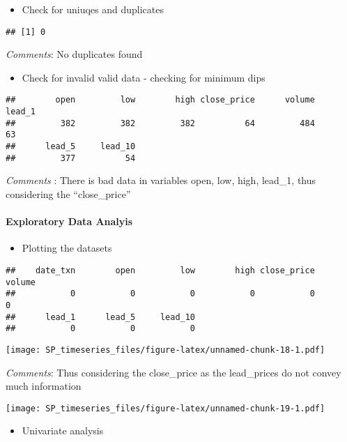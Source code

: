 \documentclass[]{article}
\providecommand{\tightlist}{%
  \setlength{\itemsep}{0pt}\setlength{\parskip}{0pt}}
\let\oldparagraph\paragraph
\renewcommand{\paragraph}[1]{\oldparagraph{#1}\mbox{}}
\begin{document}
\begin{itemize}
\tightlist
\item
  Check for uniuqes and duplicates
\end{itemize}

\begin{verbatim}
## [1] 0
\end{verbatim}

\emph{Comments}: No duplicates found

\begin{itemize}
\tightlist
\item
  Check for invalid valid data - checking for minimum dips
\end{itemize}

\begin{verbatim}
##        open         low        high close_price      volume      lead_1 
##         382         382         382          64         484          63 
##      lead_5     lead_10 
##         377          54
\end{verbatim}

\emph{Comments} : There is bad data in variables open, low, high,
lead\_1, thus considering the ``close\_price''

\paragraph{Exploratory Data Analyis}\label{exploratory-data-analyis}

\begin{itemize}
\tightlist
\item
  Plotting the datasets
\end{itemize}

\begin{verbatim}
##    date_txn        open         low        high close_price      volume 
##           0           0           0           0           0           0 
##      lead_1      lead_5     lead_10 
##           0           0           0
\end{verbatim}

\texttt{[image: SP\_timeseries\_files/figure-latex/unnamed-chunk-18-1.pdf]}

\emph{Comments}: Thus considering the close\_price as the lead\_prices
do not convey much information

\texttt{[image: SP\_timeseries\_files/figure-latex/unnamed-chunk-19-1.pdf]}

\begin{itemize}
\tightlist
\item
  Univariate analysis
\end{itemize}
\end{document}
